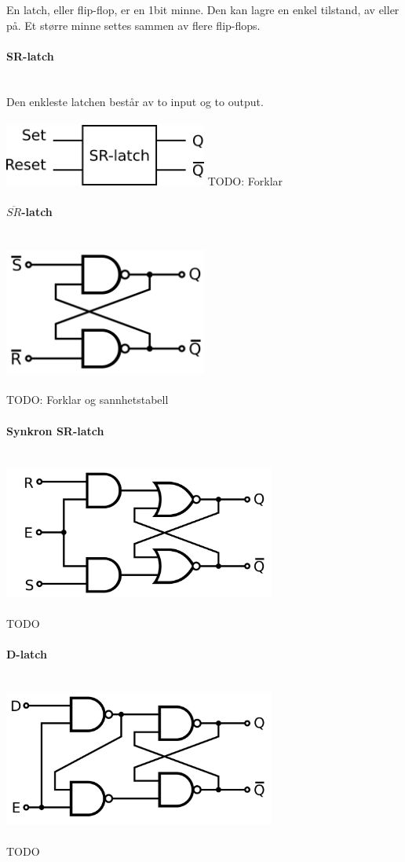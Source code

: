 En latch, eller flip-flop, er en 1bit minne.
Den kan lagre en enkel tilstand, av eller på.
Et større minne settes sammen av flere flip-flops.



\paragraph{SR-latch} \mbox{} \\
Den enkleste latchen består av to input og to output.
\\\\
\includegraphics[width=0.5\textwidth]{./img/sr-latch}
TODO: Forklar



\paragraph{$\overline{SR}$-latch} \mbox{} \\
\includegraphics[width=0.5\textwidth]{./img/not-sr}
\\\\
TODO: Forklar og sannhetstabell



\paragraph{Synkron SR-latch} \mbox{} \\
\includegraphics[width=0.67\textwidth]{./img/klokket-sr}
\\\\
TODO



\paragraph{D-latch} \mbox{} \\
\includegraphics[width=0.67\textwidth]{./img/klokket-dlatch}
\\\\
TODO
